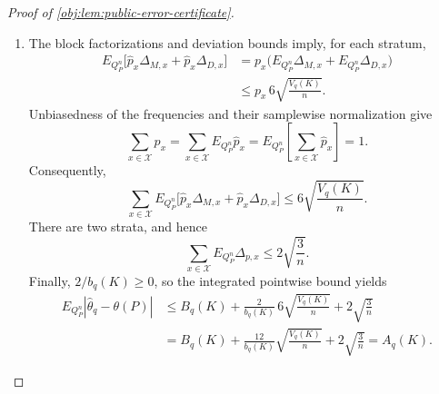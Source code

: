 \begin{proof}[Proof of \cref{obj:lem:public-error-certificate}]
\begin{enumerate}
\item
The block factorizations and deviation bounds imply, for each stratum,
\[
\begin{aligned}
E_{Q_P^n}\bigl[\widehat p_x\Delta_{M,x}
                 +\widehat p_x\Delta_{D,x}\bigr]
&=p_x\bigl(E_{Q_P^n}\Delta_{M,x}
           +E_{Q_P^n}\Delta_{D,x}\bigr)\\
&\le p_x\,6\sqrt{\frac{V_q(K)}{n}}.
\end{aligned}
\]
Unbiasedness of the frequencies and their samplewise normalization give
\[
\sum_{x\in\mathcal X}p_x
=\sum_{x\in\mathcal X}E_{Q_P^n}\widehat p_x
=E_{Q_P^n}\!\left[\sum_{x\in\mathcal X}\widehat p_x\right]
=1.
\]
Consequently,
\[
\sum_{x\in\mathcal X}
 E_{Q_P^n}\bigl[\widehat p_x\Delta_{M,x}
                  +\widehat p_x\Delta_{D,x}\bigr]
\le6\sqrt{\frac{V_q(K)}{n}}.
\]
There are two strata, and hence
\[
\sum_{x\in\mathcal X}E_{Q_P^n}\Delta_{p,x}
\le2\sqrt{\frac3n}.
\]
Finally, \(2/b_q(K)\ge0\), so the integrated pointwise bound yields
\[
\begin{aligned}
E_{Q_P^n}|\widehat\theta_q-\theta(P)|
&\le B_q(K)+\frac2{b_q(K)}\,6\sqrt{\frac{V_q(K)}{n}}
             +2\sqrt{\frac3n}\\
&=B_q(K)+\frac{12}{b_q(K)}\sqrt{\frac{V_q(K)}{n}}
             +2\sqrt{\frac3n}
=A_q(K).
\end{aligned}
\]
\end{enumerate}
\end{proof}
